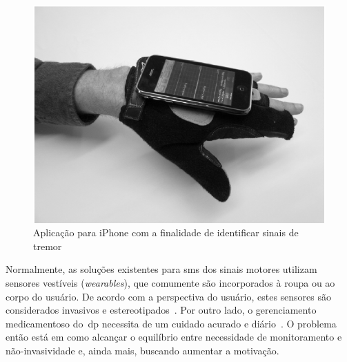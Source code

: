 \begin{figure}
\centering
  \includegraphics[scale=0.3]{./img/moyne-iphone.png}
\caption[Aplicação para \textit{smartphone} com a finalidade de identificar sinais de tremor]{Aplicação para iPhone com a finalidade de identificar sinais de tremor ~\cite{lemoyne2010}}
 \label{fig:iphone-tremor}
\end{figure}







Normalmente, as soluções existentes para \ac{sms} dos sinais motores utilizam sensores vestíveis (\textit{wearables}), que comumente são incorporados à roupa ou ao corpo do usuário. De acordo com a perspectiva do usuário, estes sensores são considerados invasivos e estereotipados~\cite{aarhus_negotiating_2010}. Por outro lado, o gerenciamento medicamentoso do~\ac{dp} necessita de um cuidado acurado e diário~\cite{quantitativeparkinson2011}. O problema então está em como alcançar o equilíbrio entre necessidade de monitoramento e não-invasividade e, ainda mais, buscando aumentar a motivação.


